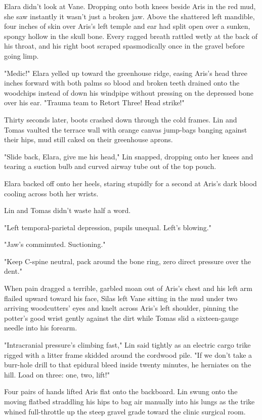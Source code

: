 Elara didn't look at Vane. Dropping onto both knees beside Aris in the red mud, she saw instantly it wasn't just a broken jaw. Above the shattered left mandible, four inches of skin over Aris's left temple and ear had split open over a sunken, spongy hollow in the skull bone. Every ragged breath rattled wetly at the back of his throat, and his right boot scraped spasmodically once in the gravel before going limp.

"Medic!" Elara yelled up toward the greenhouse ridge, easing Aris's head three inches forward with both palms so blood and broken teeth drained onto the woodchips instead of down his windpipe without pressing on the depressed bone over his ear. "Trauma team to Retort Three! Head strike!"

Thirty seconds later, boots crashed down through the cold frames. Lin and Tomas vaulted the terrace wall with orange canvas jump-bags banging against their hips, mud still caked on their greenhouse aprons.

"Slide back, Elara, give me his head," Lin snapped, dropping onto her knees and tearing a suction bulb and curved airway tube out of the top pouch.

Elara backed off onto her heels, staring stupidly for a second at Aris's dark blood cooling across both her wrists.

Lin and Tomas didn't waste half a word.

"Left temporal-parietal depression, pupils unequal. Left's blowing."

"Jaw's comminuted. Suctioning."

"Keep C-spine neutral, pack around the bone ring, zero direct pressure over the dent."

When pain dragged a terrible, garbled moan out of Aris's chest and his left arm flailed upward toward his face, Silas left Vane sitting in the mud under two arriving woodcutters' eyes and knelt across Aris's left shoulder, pinning the potter's good wrist gently against the dirt while Tomas slid a sixteen-gauge needle into his forearm.

"Intracranial pressure's climbing fast," Lin said tightly as an electric cargo trike rigged with a litter frame skidded around the cordwood pile. "If we don't take a burr-hole drill to that epidural bleed inside twenty minutes, he herniates on the hill. Load on three: one, two, lift!"

Four pairs of hands lifted Aris flat onto the backboard. Lin swung onto the moving flatbed straddling his hips to bag air manually into his lungs as the trike whined full-throttle up the steep gravel grade toward the clinic surgical room.

